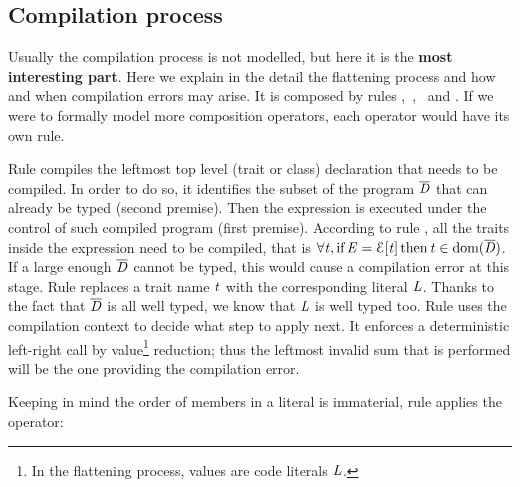 \saveSpace
\subsection{Compilation process}
\saveSpace
Usually the compilation process is not modelled, but here it is the \textbf{most interesting part}.
Here we explain in the detail the flattening process and how and when compilation errors may arise.
It is composed by rules ,\ ,\  and .
If we were to formally model more composition operators, each operator would have its own  rule.

Rule 
compiles the leftmost top level (trait or class) declaration that needs to be compiled.
In order to do so,
it identifies the subset of the program $\overline{\mathit{D}}$ that can already be typed (second premise).
Then the expression is executed under the control of such compiled program (first premise).
According to rule , all the traits inside the expression need to
be compiled, that is $\forall\mathit{t}, \text{if}\, \mathit{E}={\cal{E}}[\mathit{t}]\,\text{then}\, \mathit{t}\in\text{dom}(\overline{\mathit{D}})$.
If a large enough $\overline{\mathit{D}}$ cannot be typed, this would cause a compilation error
at this stage.
Rule 
replaces a trait name $\mathit{t}$ with the corresponding literal $\mathit{L}$.
Thanks to the fact that $\overline{\mathit{D}}$ is all well typed, we know that $\mathit{L}$ is well typed too.
Rule 
uses the compilation context to decide what step to apply next.
It enforces a deterministic left-right call by value\footnote{
In the flattening process, values are code literals $\mathit{L}$.} reduction;
thus the leftmost invalid sum that is performed will be the one providing the compilation error.

Keeping in mind the order of members in a literal is immaterial, rule 
applies the operator:

